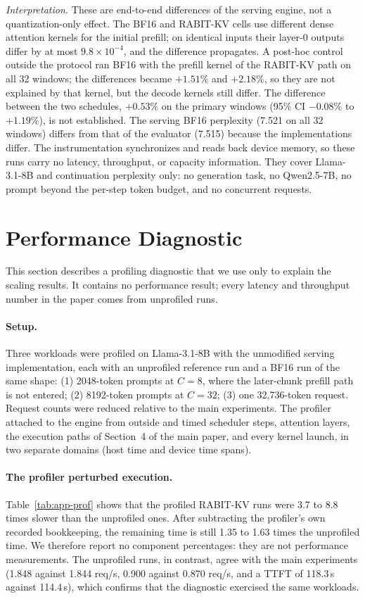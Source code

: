 \documentclass{article}
\begin{document}
\emph{Interpretation.} These are end-to-end differences of the serving engine, not a quantization-only
effect. The BF16 and RABIT-KV cells use different dense attention kernels for the initial prefill; on
identical inputs their layer-0 outputs differ by at most $9.8\times10^{-4}$, and the difference
propagates. A post-hoc control outside the protocol ran BF16 with the prefill kernel of the RABIT-KV
path on all 32 windows; the differences became $+1.51\%$ and $+2.18\%$, so they are not explained by
that kernel, but the decode kernels still differ. The difference between the two schedules, $+0.53\%$
on the primary windows (95\% CI $-0.08\%$ to $+1.19\%$), is not established. The serving BF16
perplexity (7.521 on all 32 windows) differs from that of the evaluator (7.515) because the
implementations differ. The instrumentation synchronizes and reads back device memory, so these runs
carry no latency, throughput, or capacity information. They cover Llama-3.1-8B and continuation
perplexity only: no generation task, no Qwen2.5-7B, no prompt beyond the per-step token budget, and no
concurrent requests.

\FloatBarrier  %
\section{Performance Diagnostic}
\label{app:profile}

This section describes a profiling diagnostic that we use only to explain the scaling results. It
contains no performance result; every latency and throughput number in the paper comes from unprofiled
runs.

\paragraph{Setup.}
Three workloads were profiled on Llama-3.1-8B with the unmodified serving implementation, each with an
unprofiled reference run and a BF16 run of the same shape: (1) 2048-token prompts at $C{=}8$, where the
later-chunk prefill path is not entered; (2) 8192-token prompts at $C{=}32$; (3) one 32,736-token
request. Request counts were reduced relative to the main experiments. The profiler attached to the
engine from outside and timed scheduler steps, attention layers, the execution paths of Section~4 of
the main paper, and every kernel launch, in two separate domains (host time and device time spans).

\paragraph{The profiler perturbed execution.}
Table~\ref{tab:app-prof} shows that the profiled RABIT-KV runs were 3.7 to 8.8 times slower than the
unprofiled ones. After subtracting the profiler's own recorded bookkeeping, the remaining time is
still 1.35 to 1.63 times the unprofiled time. We therefore report no component percentages: they are
not performance measurements. The unprofiled runs, in contrast, agree with the main experiments
(1.848 against 1.844 req/s, 0.900 against 0.870 req/s, and a TTFT of 118.3\,s against 114.4\,s), which
confirms that the diagnostic exercised the same workloads.
\end{document}
